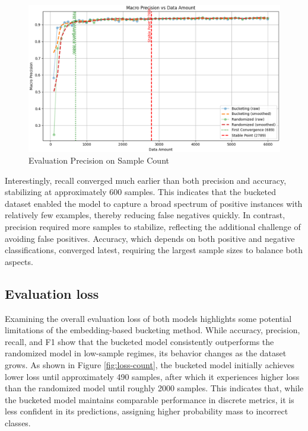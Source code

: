 \documentclass[twocolumn]{article}
\newcounter{ex}
\renewcommand{\indent}{\hspace*{2em}}
\begin{document}
\begin{figure}[H]
\centering
\includegraphics[width=1\linewidth]{precision-count-2.eps}
\caption{Evaluation Precision on Sample Count}
\label{fig:precision-acount}
\end{figure}

\indent Interestingly, recall converged much earlier than both precision and accuracy, stabilizing at approximately 600 samples. This indicates that the bucketed dataset enabled the model to capture a broad spectrum of positive instances with relatively few examples, thereby reducing false negatives quickly. In contrast, precision required more samples to stabilize, reflecting the additional challenge of avoiding false positives. Accuracy, which depends on both positive and negative classifications, converged latest, requiring the largest sample sizes to balance both aspects.

\subsection{Evaluation loss}
\indent Examining the overall evaluation loss of both models highlights some potential limitations of the embedding-based bucketing method. While accuracy, precision, recall, and F1 show that the bucketed model consistently outperforms the randomized model in low-sample regimes, its behavior changes as the dataset grows. As shown in Figure \ref{fig:loss-count}, the bucketed model initially achieves lower loss until approximately 490 samples, after which it experiences higher loss than the randomized model until roughly 2000 samples. This indicates that, while the bucketed model maintains comparable performance in discrete metrics, it is less confident in its predictions, assigning higher probability mass to incorrect classes.
\end{document}
